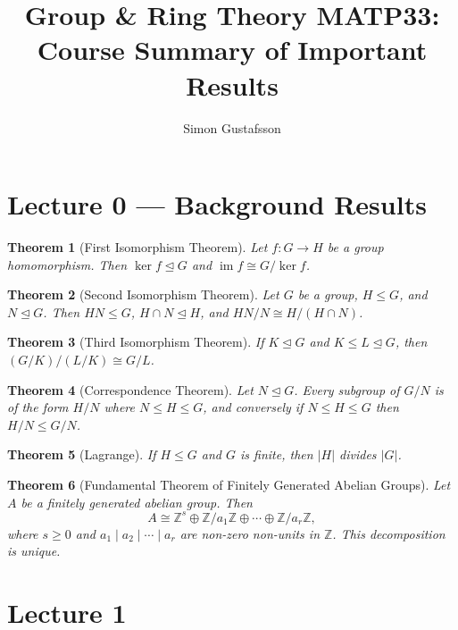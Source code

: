 \documentclass[12pt]{article}
\title{Group \& Ring Theory MATP33: Course Summary of Important Results}
\author{Simon Gustafsson}
\date{}
\newtheorem{theorem}{Theorem}
\begin{document}
\maketitle

\section*{Lecture 0 — Background Results}

\begin{theorem}[First Isomorphism Theorem]
Let $f : G \to H$ be a group homomorphism. Then $\ker f \trianglelefteq G$ and $\operatorname{im} f \cong G / \ker f$.
\end{theorem}

\begin{theorem}[Second Isomorphism Theorem]
Let $G$ be a group, $H \leq G$, and $N \trianglelefteq G$. Then $HN \leq G$, $H \cap N \trianglelefteq H$, and $HN/N \cong H/(H \cap N)$.
\end{theorem}

\begin{theorem}[Third Isomorphism Theorem]
If $K \trianglelefteq G$ and $K \leq L \trianglelefteq G$, then $(G/K)/(L/K) \cong G/L$.
\end{theorem}

\begin{theorem}[Correspondence Theorem]
Let $N \trianglelefteq G$. Every subgroup of $G/N$ is of the form $H/N$ where $N \leq H \leq G$, and conversely if $N \leq H \leq G$ then $H/N \leq G/N$.
\end{theorem}

\begin{theorem}[Lagrange]
If $H \leq G$ and $G$ is finite, then $|H|$ divides $|G|$.
\end{theorem}

\begin{theorem}[Fundamental Theorem of Finitely Generated Abelian Groups]
Let $A$ be a finitely generated abelian group. Then
\[
  A \cong \mathbb{Z}^s \oplus \mathbb{Z}/a_1\mathbb{Z} \oplus \cdots \oplus \mathbb{Z}/a_r\mathbb{Z},
\]
where $s \geq 0$ and $a_1 \mid a_2 \mid \cdots \mid a_r$ are non-zero non-units in $\mathbb{Z}$. This decomposition is unique.
\end{theorem}

\section*{Lecture 1}
\end{document}
